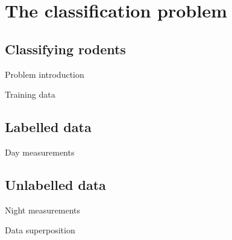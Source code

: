\section{The classification problem}

\subsection{Classifying rodents}

\begin{frame}{Problem introduction}

\end{frame}

\begin{frame}{Training data}

\end{frame}

\subsection{Labelled data}

\begin{frame}{Day measurements}
\end{frame}

\subsection{Unlabelled data}

\begin{frame}{Night measurements}
\end{frame}

\begin{frame}{Data superposition}
\end{frame}
